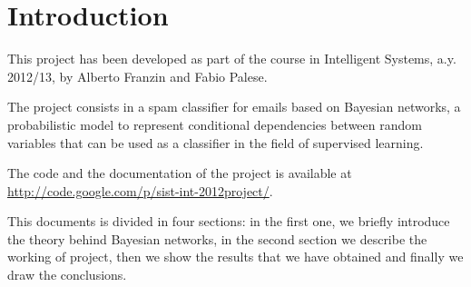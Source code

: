 \section{Introduction}
This project has been developed as part of the course in Intelligent Systems, a.y. 2012/13, by Alberto Franzin and Fabio Palese.

The project consists in a spam classifier for emails based on Bayesian networks, a probabilistic model to represent conditional dependencies between random variables that can be used as a classifier in the field of supervised learning.

The code and the documentation of the project is available at\\ \url{http://code.google.com/p/sist-int-2012project/}.

This documents is divided in four sections: in the first one, we briefly introduce the theory behind Bayesian networks, in the second section we describe the working of project, then we show the results that we have obtained and finally we draw the conclusions.
